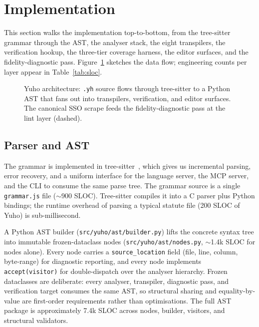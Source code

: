 \section{Implementation}
\label{sec:implementation}

This section walks the implementation top-to-bottom, from the tree-sitter
grammar through the AST, the analyser stack, the eight transpilers, the
verification hookup, the three-tier coverage harness, the editor surfaces,
and the fidelity-diagnostic pass. Figure~\ref{fig:architecture} sketches
the data flow; engineering counts per layer appear in
Table~\ref{tab:sloc}.

\begin{figure}[!htbp]
\centering
\resizebox{0.95\textwidth}{!}{}
\caption{Yuho architecture: \texttt{.yh} source flows through tree-sitter
to a Python AST that fans out into transpilers, verification, and editor
surfaces. The canonical SSO scrape feeds the fidelity-diagnostic pass at
the lint layer (dashed).}
\label{fig:architecture}
\end{figure}

\subsection{Parser and AST}
\label{subsec:parser}
The grammar is implemented in tree-sitter~\cite{treesitter}, which gives
us incremental parsing, error recovery, and a uniform interface for the
language server, the MCP server, and the CLI to consume the same parse
tree. The grammar source is a single \texttt{grammar.js} file ($\sim$900
SLOC). Tree-sitter compiles it into a C parser plus Python bindings; the
runtime overhead of parsing a typical statute file (200 SLOC of Yuho) is
sub-millisecond.

A Python AST builder (\texttt{src/yuho/ast/builder.py}) lifts the
concrete syntax tree into immutable frozen-dataclass nodes
(\texttt{src/yuho/ast/nodes.py}, $\sim$1.4k SLOC for nodes alone). Every
node carries a \texttt{source\_location} field (file, line, column,
byte-range) for diagnostic reporting, and every node implements
\texttt{accept(visitor)} for double-dispatch over the analyser
hierarchy. Frozen dataclasses are deliberate: every analyser, transpiler,
diagnostic pass, and verification target consumes the same AST, so
structural sharing and equality-by-value are first-order requirements
rather than optimisations. The full AST package is approximately 7.4k
SLOC across nodes, builder, visitors, and structural validators.

